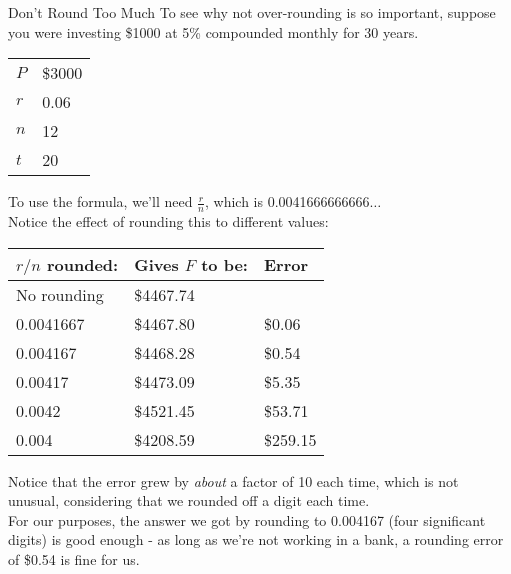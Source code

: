 \begin{example}{Don't Round Too Much}
To see why not over-rounding is so important, suppose you were investing \$1000 at 5\% compounded monthly for 30 years.
\begin{center}
\begin{tabular}{l l}
$P$ & \$3000\\
$r$ & 0.06\\
$n$ & 12\\
$t$ & 20
\end{tabular}
\end{center}
To use the formula, we'll need $\frac{r}{n}$, which is 0.0041666666666$\ldots$\\

Notice the effect of rounding this to different values:
\begin{center}
\begin{tabular}{l l l}
$r/n$ rounded: & Gives $F$ to be: & Error\\
\hline
No rounding & \$4467.74 & \\
0.0041667 & \$4467.80 & \$0.06\\
0.004167 & \$4468.28 & \$0.54\\
0.00417 & \$4473.09 & \$5.35\\
0.0042 & \$4521.45 & \$53.71\\
0.004 & \$4208.59 & \$259.15
\end{tabular}
\end{center}
Notice that the error grew by \textit{about} a factor of 10 each time, which is not unusual, considering that we rounded off a digit each time. \\

For our purposes, the answer we got by rounding to 0.004167 (four significant digits) is good enough - as long as we're not working in a bank, a rounding error of \$0.54 is fine for us.
\end{example}
\vfill
\text{}
\vfill
\pagebreak

